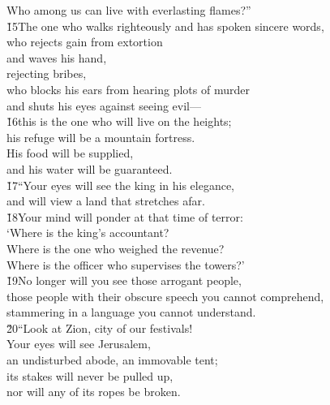 \begin{poetry}
\poemll    Who among us can live with everlasting flames?'' \\
\poeml \v{15}The one who walks righteously and has spoken sincere words, \\
\poemll    who rejects gain from extortion \\
\poeml and waves his hand, \\
\poemll    rejecting bribes, \\
\poemll    who blocks his ears from hearing plots of murder \\
\poemlll       and shuts his eyes against seeing evil--- \\
\poeml \v{16}this is the one who will live on the heights; \\
\poemll    his refuge will be a mountain fortress. \\
\poeml His food will be supplied, \\
\poemll    and his water will be guaranteed. \\
\poeml \v{17}``Your eyes will see the king in his elegance, \\
\poemll    and will view a land that stretches afar. \\
\poeml \v{18}Your mind will ponder at that time of terror: \\
\poemll    `Where is the king's accountant? \\
\poeml Where is the one who weighed the revenue? \\
\poemll    Where is the officer who supervises the towers?' \\
\poeml \v{19}No longer will you see those arrogant people, \\
\poemll    those people with their obscure speech you cannot comprehend, \\
\poemll    stammering in a language you cannot understand. \\
\poeml \v{20}``Look at Zion, city of our festivals! \\
\poemll    Your eyes will see Jerusalem, \\
\poemlll       an undisturbed abode, an immovable tent; \\
\poeml its stakes will never be pulled up, \\
\poemll    nor will any of its ropes be broken. \\

\end{poetry}
